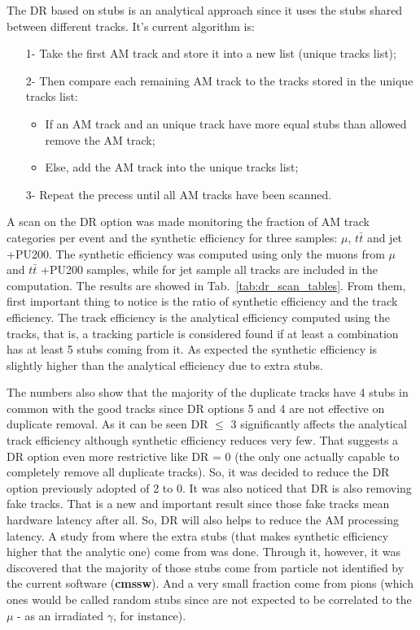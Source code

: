 The DR based on stubs is an analytical approach since it uses the stubs shared between different tracks. It's current algorithm is:

\begin{itemize}
	\item [1-] Take the first AM track and store it into a new list (unique tracks list);
	\item [2-] Then compare each remaining AM track to the tracks stored in the unique tracks list:
	\begin{itemize}
		\item If an AM track and an unique track have more equal stubs than allowed remove the AM track;
		\item Else, add the AM track into the unique tracks list;
	\end{itemize}
	\item [3-] Repeat the precess until all AM tracks have been scanned.
\end{itemize}

A scan on the DR option was made monitoring the fraction of AM track categories per event and the synthetic efficiency for three samples: $\mu$, $t\bar{t}$ and jet +PU200. The synthetic efficiency was computed using only the muons from $\mu$ and $t\bar{t}$ +PU200 samples, while for jet sample all tracks are included in the computation. The results are showed in Tab.~\ref{tab:dr_scan_tables}. From them, first important thing to notice is the ratio of synthetic efficiency and the track efficiency. The track efficiency is the analytical efficiency computed using the tracks, that is, a tracking particle is considered found if at least a combination has at least 5 stubs coming from it.  As expected the synthetic efficiency is slightly higher than the analytical efficiency due to extra stubs.

The numbers also show that the majority of the duplicate tracks have 4 stubs in common with the good tracks since DR options 5 and 4 are not effective on duplicate removal. As it can be seen DR $\leq$ 3 significantly affects the analytical track efficiency although synthetic efficiency reduces very few. That suggests a DR option even more restrictive like DR = 0 (the only one actually capable to completely remove all duplicate tracks). So, it was decided to reduce the DR option previously adopted of 2 to 0. It was also noticed that DR is also removing fake tracks. That is a new and important result since those fake tracks mean hardware latency after all. So, DR will also helps to reduce the AM processing latency. A study from where the extra stubs (that makes synthetic efficiency higher that the analytic one) come from was done. Through it, however, it was discovered that the majority of those stubs come from particle not identified by the current software (\textbf{cmssw}). And a very small fraction come from pions (which ones would be called random stubs since are not expected to be correlated to the $\mu$ - as an irradiated $\gamma$, for instance).

